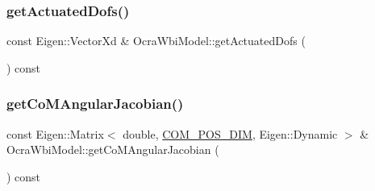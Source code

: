 \hypertarget{classocra__icub_1_1OcraWbiModel_acd7bfd155351337be585ae2171f9ddca}{}\label{classocra__icub_1_1OcraWbiModel_acd7bfd155351337be585ae2171f9ddca} 
\subsubsection{\texorpdfstring{get\+Actuated\+Dofs()}{getActuatedDofs()}}
{\footnotesize\ttfamily const Eigen\+::\+Vector\+Xd \& Ocra\+Wbi\+Model\+::get\+Actuated\+Dofs (\begin{DoxyParamCaption}{ }\end{DoxyParamCaption}) const\hspace{0.3cm}{\ttfamily [virtual]}}

\hypertarget{classocra__icub_1_1OcraWbiModel_aca6a017f40a432142653bf3fa50f425d}{}\label{classocra__icub_1_1OcraWbiModel_aca6a017f40a432142653bf3fa50f425d} 
\subsubsection{\texorpdfstring{get\+Co\+M\+Angular\+Jacobian()}{getCoMAngularJacobian()}}
{\footnotesize\ttfamily const Eigen\+::\+Matrix$<$ double, \hyperlink{OcraWbiModel_8cpp_a72cb22de2538ae949cc73fa3d7c33bdc}{C\+O\+M\+\_\+\+P\+O\+S\+\_\+\+D\+IM}, Eigen\+::\+Dynamic $>$ \& Ocra\+Wbi\+Model\+::get\+Co\+M\+Angular\+Jacobian (\begin{DoxyParamCaption}{ }\end{DoxyParamCaption}) const\hspace{0.3cm}{\ttfamily [virtual]}}

\hypertarget{classocra__icub_1_1OcraWbiModel_a48de3ef0a8531b4f1f68d4d53288b1e4}{}\label{classocra__icub_1_1OcraWbiModel_a48de3ef0a8531b4f1f68d4d53288b1e4} 
